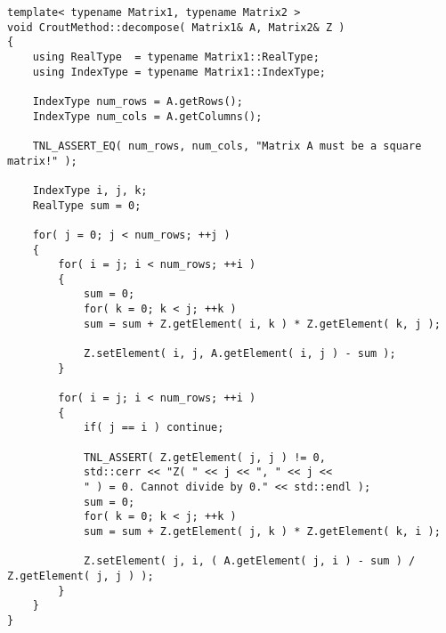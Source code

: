 \begin{lstlisting}[language={},caption={Implementation of the Crout method on the CPU using matrix $ \mathbb{Z} $. Taken from the Decomposition project repository on GitLab\protect\footref{Footnote:decomposition-project-gitlab-url}.},label={Listing:crout-method-implementation-CPU-Z}]
template< typename Matrix1, typename Matrix2 >
void CroutMethod::decompose( Matrix1& A, Matrix2& Z )
{
	using RealType  = typename Matrix1::RealType;
	using IndexType = typename Matrix1::IndexType;
	
	IndexType num_rows = A.getRows();
	IndexType num_cols = A.getColumns();
	
	TNL_ASSERT_EQ( num_rows, num_cols, "Matrix A must be a square matrix!" );
	
	IndexType i, j, k;
	RealType sum = 0;
	
	for( j = 0; j < num_rows; ++j )
	{
		for( i = j; i < num_rows; ++i )
		{
			sum = 0;
			for( k = 0; k < j; ++k )
			sum = sum + Z.getElement( i, k ) * Z.getElement( k, j );
			
			Z.setElement( i, j, A.getElement( i, j ) - sum );
		}
		
		for( i = j; i < num_rows; ++i )
		{
			if( j == i ) continue;
			
			TNL_ASSERT( Z.getElement( j, j ) != 0,
			std::cerr << "Z( " << j << ", " << j <<
			" ) = 0. Cannot divide by 0." << std::endl );
			sum = 0;
			for( k = 0; k < j; ++k )
			sum = sum + Z.getElement( j, k ) * Z.getElement( k, i );
			
			Z.setElement( j, i, ( A.getElement( j, i ) - sum ) / Z.getElement( j, j ) );
		}
	}
}
\end{lstlisting}